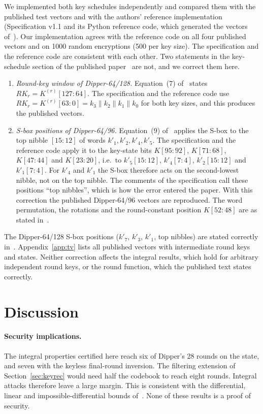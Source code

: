 \documentclass[11pt,a4paper]{article}
\theoremstyle{definition}
\theoremstyle{remark}
\begin{document}
We implemented both key schedules independently and compared them with the published test vectors and with the authors' reference implementation (Specification v1.1 and its Python reference code, which generated the vectors of~\cite{dipper2026}). Our implementation agrees with the reference code on all four published vectors and on 1000 random encryptions (500 per key size). The specification and the reference code are consistent with each other. Two statements in the key-schedule section of the published paper~\cite{dipper2026} are not, and we correct them here.
\begin{enumerate}
\item \emph{Round-key window of Dipper-64/128.} Equation~(7) of~\cite{dipper2026} states $RK_r=K^{(r)}[127{:}64]$. The specification and the reference code use $RK_r=K^{(r)}[63{:}0]=k_3\|k_2\|k_1\|k_0$ for both key sizes, and this produces the published vectors.
\item \emph{S-box positions of Dipper-64/96.} Equation~(9) of~\cite{dipper2026} applies the S-box to the top nibble $[15{:}12]$ of words $k'_1,k'_2,k'_4,k'_5$. The specification and the reference code apply it to the key-state bits $K[95{:}92]$, $K[71{:}68]$, $K[47{:}44]$ and $K[23{:}20]$, i.e.\ to $k'_5[15{:}12]$, $k'_4[7{:}4]$, $k'_2[15{:}12]$ and $k'_1[7{:}4]$. For $k'_4$ and $k'_1$ the S-box therefore acts on the second-lowest nibble, not on the top nibble. The comments of the specification call these positions ``top nibbles'', which is how the error entered the paper. With this correction the published Dipper-64/96 vectors are reproduced. The word permutation, the rotations and the round-constant position $K[52{:}48]$ are as stated in~\cite{dipper2026}.
\end{enumerate}
The Dipper-64/128 S-box positions ($k'_7$, $k'_3$, $k'_1$, top nibbles) are stated correctly in~\cite{dipper2026}. Appendix~\ref{app:tv} lists all published vectors with intermediate round keys and states. Neither correction affects the integral results, which hold for arbitrary independent round keys, or the round function, which the published text states correctly.

\section{Discussion}\label{sec:discussion}

\paragraph{Security implications.} The integral properties certified here reach six of Dipper's 28 rounds on the state, and seven with the keyless final-round inversion. The filtering extension of Section~\ref{sec:keyrec} would need half the codebook to reach eight rounds. Integral attacks therefore leave a large margin. This is consistent with the differential, linear and impossible-differential bounds of~\cite{dipper2026}. None of these results is a proof of security.
\end{document}
